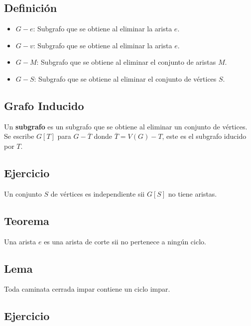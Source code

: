 \documentclass[a4paper,dvipsnames]{book}
\begin{document}
\subsection{Definición}

\begin{itemize}
    \item \(G-e\): Subgrafo que se obtiene al eliminar la arista \(e\).
    \item \(G-v\): Subgrafo que se obtiene al eliminar la arista \(e\).
    \item \(G-M\): Subgrafo que se obtiene al eliminar el conjunto de aristas \(M\).
    \item \(G-S\): Subgrafo que se obtiene al eliminar el conjunto de vértices \(S\).
\end{itemize}

\subsection{Grafo Inducido}
\label{ssec:grafo_inducido}

Un \textbf{subgrafo} es un subgrafo que se obtiene al eliminar un conjunto de vértices. Se escribe \(G\left[T\right]\) para \(G-\overline{T}\) donde \(\overline{T}=V\left(G\right)-T\), este es el subgrafo iducido por \(T\).

\subsection{Ejercicio}

Un conjunto \(S\) de vértices es independiente sii \(G\left[S\right]\) no tiene
aristas.

\subsection{Teorema}

Una arista \(e\) es una arista de corte sii no pertenece a ningún ciclo.


\subsection{Lema}

Toda caminata cerrada impar contiene un ciclo impar.

\subsection{Ejercicio}
\end{document}
